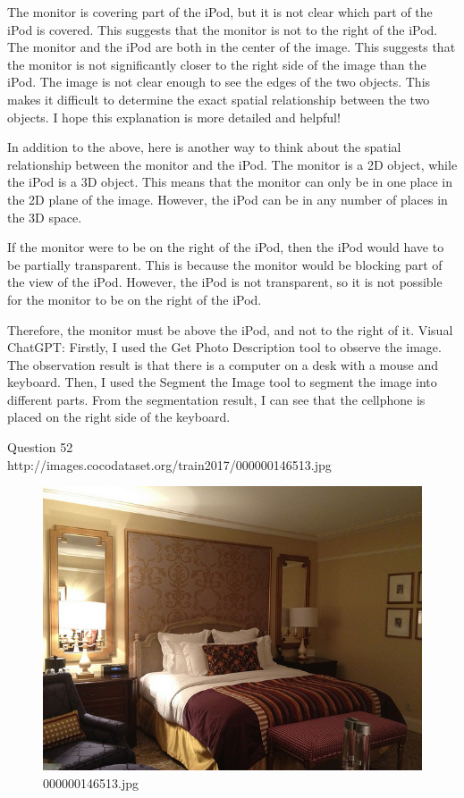 \begin{enumerate}
    The monitor is covering part of the iPod, but it is not clear which part of the iPod is covered. This suggests that the monitor is not to the right of the iPod.
    The monitor and the iPod are both in the center of the image. This suggests that the monitor is not significantly closer to the right side of the image than the iPod.
    The image is not clear enough to see the edges of the two objects. This makes it difficult to determine the exact spatial relationship between the two objects.
    I hope this explanation is more detailed and helpful!

    In addition to the above, here is another way to think about the spatial relationship between the monitor and the iPod. The monitor is a 2D object, while the iPod is a 3D object. This means that the monitor can only be in one place in the 2D plane of the image. However, the iPod can be in any number of places in the 3D space.

    If the monitor were to be on the right of the iPod, then the iPod would have to be partially transparent. This is because the monitor would be blocking part of the view of the iPod. However, the iPod is not transparent, so it is not possible for the monitor to be on the right of the iPod.

    Therefore, the monitor must be above the iPod, and not to the right of it.
    \subitem Visual ChatGPT: Firstly, I used the Get Photo Description tool to observe the image. The observation result is that there is a computer on a desk with a mouse and keyboard. Then, I used the Segment the Image tool to segment the image into different parts. From the segmentation result, I can see that the cellphone is placed on the right side of the keyboard.
\end{enumerate}
Question 52\\
http://images.cocodataset.org/train2017/000000146513.jpg
\begin{figure}[h]
    \centering
    \includegraphics[width=0.8\linewidth]{../image set/hard/000000146513.jpg}
    \caption{000000146513.jpg}
\end{figure}
